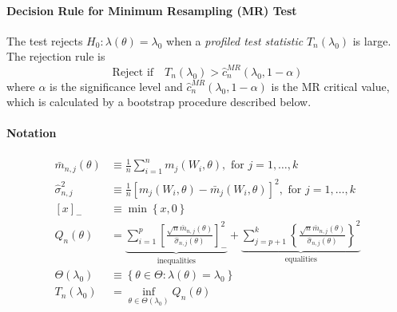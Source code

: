\documentclass[12pt]{article}
\begin{document}
\paragraph{Decision Rule for Minimum Resampling (MR) Test}
The test rejects $H_0\colon \lambda(\theta) = \lambda_0$ when a \emph{profiled test statistic} $T_n(\lambda_0)$ is large.
The rejection rule is
\[
  \text{Reject if} \quad T_n(\lambda_0) > \widehat{c}_n^{MR}(\lambda_0, 1-\alpha) 
\]
where $\alpha$ is the significance level and $\widehat{c}_n^{MR}(\lambda_0, 1-\alpha)$ is the MR critical value, which is calculated by a bootstrap procedure described below.

\paragraph{Notation}
\begin{align*}
  \bar{m}_{n,j}(\theta) &\equiv \frac{1}{n}\sum_{i=1}^n m_j(W_i,\theta), \mbox{ for } j = 1, \hdots, k\\
  \widehat{\sigma}^2_{n,j} &\equiv \frac{1}{n}\left[ m_j(W_i,\theta) - \bar{m}_j(W_i,\theta) \right]^2, \mbox{ for } j = 1, \hdots, k\\
[x]_{-} &\equiv \min\left\{ x, 0 \right\}\\
  Q_n(\theta) &= \underbrace{\sum_{i=1}^p \left[ \frac{\sqrt{n}\bar{m}_{n,j}(\theta)}{\widehat{\sigma}_{n,j}(\theta)} \right]_{-}^{2}}_{\text{inequalities}} + \underbrace{\sum_{j=p+1}^{k} \left\{ \frac{\sqrt{n}\bar{m}_{n,j}(\theta)}{\widehat{\sigma}_{n,j}(\theta)} \right\}^2}_{\text{equalities}}\\
  \Theta(\lambda_0) &\equiv \left\{ \theta \in \Theta\colon \lambda(\theta) = \lambda_0 \right\}\\
  T_n(\lambda_0) &= \inf_{\theta \in \Theta(\lambda_0)} Q_n(\theta)
\end{align*}
\end{document}
